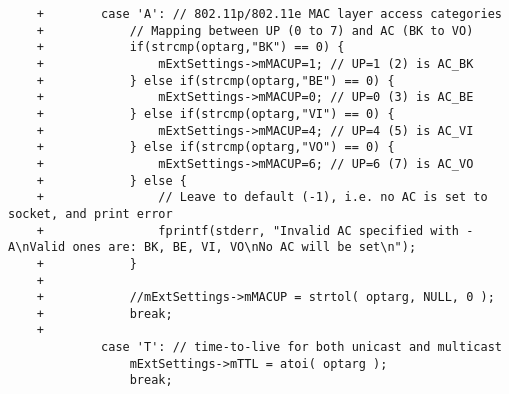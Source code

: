 \begin{lstlisting}
    +        case 'A': // 802.11p/802.11e MAC layer access categories
    +            // Mapping between UP (0 to 7) and AC (BK to VO)
    +            if(strcmp(optarg,"BK") == 0) {
    +                mExtSettings->mMACUP=1; // UP=1 (2) is AC_BK
    +            } else if(strcmp(optarg,"BE") == 0) {
    +                mExtSettings->mMACUP=0; // UP=0 (3) is AC_BE
    +            } else if(strcmp(optarg,"VI") == 0) {
    +                mExtSettings->mMACUP=4; // UP=4 (5) is AC_VI
    +            } else if(strcmp(optarg,"VO") == 0) {
    +                mExtSettings->mMACUP=6; // UP=6 (7) is AC_VO
    +            } else {
    +                // Leave to default (-1), i.e. no AC is set to socket, and print error
    +                fprintf(stderr, "Invalid AC specified with -A\nValid ones are: BK, BE, VI, VO\nNo AC will be set\n");
    +            }
    +
    +            //mExtSettings->mMACUP = strtol( optarg, NULL, 0 );
    +            break;
    +
             case 'T': // time-to-live for both unicast and multicast
                 mExtSettings->mTTL = atoi( optarg );
                 break;
\end{lstlisting}